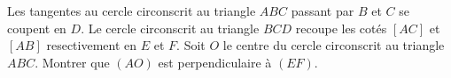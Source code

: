 \documentclass[varwidth]{standalone}
\begin{document}
    Les tangentes au cercle circonscrit au triangle $ABC$ passant par $B$ et $C$ se coupent en $D$. Le cercle circonscrit au triangle $BCD$ recoupe les cot\'es $[AC]$ et $[AB]$ resectivement en $E$ et $F$. Soit $O$ le centre du cercle circonscrit au triangle $ABC$. Montrer que $(AO)$ est perpendiculaire \`a $(EF)$.
\end{document}

